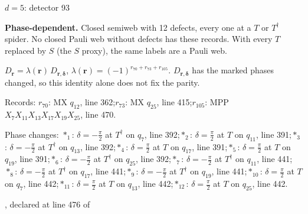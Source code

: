 \label{d5_det093}
{\Large $d=5$: detector 93}\par
\textbf{Phase-dependent.} Closed semiweb with 12 defects, every one at a $T$ or $T^\dagger$ spider. No closed Pauli web without defects has these records. With every $T$ replaced by $S$ (the $S$ proxy), the same labels are a Pauli web.
\begin{center}
\end{center}
\vspace{-1mm}
$D_{\boldsymbol r}=\lambda(\boldsymbol r)\,D_{\boldsymbol r,\boldsymbol\delta}$, \quad $\lambda(\boldsymbol r)=(-1)^{r_{70}+r_{73}+r_{105}}$. \qquad $D_{\boldsymbol r,\boldsymbol\delta}$ has the marked phases changed, so this identity alone does not fix the parity.
\par\smallskip\begin{minipage}{.98\linewidth}\small Records: $r_{70}$: MX $q_{12}$, line 362;\quad $r_{73}$: MX $q_{25}$, line 415;\quad $r_{105}$: MPP $X_{7}X_{11}X_{13}X_{17}X_{19}X_{25}$, line 470.\end{minipage}
\par\smallskip\begin{minipage}{.98\linewidth}\small Phase changes: $\ast_{1}$: $\delta=-\frac{\pi}{2}$ at $T^\dagger$ on $q_{7}$, line 392;\quad $\ast_{2}$: $\delta=\frac{\pi}{2}$ at $T$ on $q_{11}$, line 391;\quad $\ast_{3}$: $\delta=-\frac{\pi}{2}$ at $T^\dagger$ on $q_{13}$, line 392;\quad $\ast_{4}$: $\delta=\frac{\pi}{2}$ at $T$ on $q_{17}$, line 391;\quad $\ast_{5}$: $\delta=\frac{\pi}{2}$ at $T$ on $q_{19}$, line 391;\quad $\ast_{6}$: $\delta=-\frac{\pi}{2}$ at $T^\dagger$ on $q_{25}$, line 392;\quad $\ast_{7}$: $\delta=-\frac{\pi}{2}$ at $T^\dagger$ on $q_{11}$, line 441;\quad $\ast_{8}$: $\delta=-\frac{\pi}{2}$ at $T^\dagger$ on $q_{17}$, line 441;\quad $\ast_{9}$: $\delta=-\frac{\pi}{2}$ at $T^\dagger$ on $q_{19}$, line 441;\quad $\ast_{10}$: $\delta=\frac{\pi}{2}$ at $T$ on $q_{7}$, line 442;\quad $\ast_{11}$: $\delta=\frac{\pi}{2}$ at $T$ on $q_{13}$, line 442;\quad $\ast_{12}$: $\delta=\frac{\pi}{2}$ at $T$ on $q_{25}$, line 442.\end{minipage}
\vfill
{\footnotesize\texttt{}, declared at line 476 of \texttt{}}
\newpage

